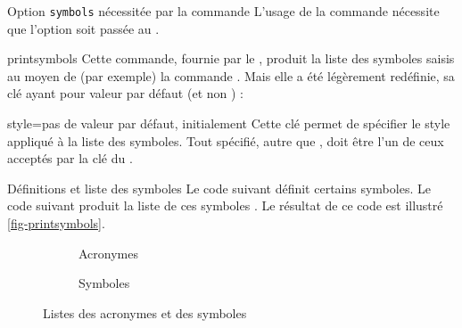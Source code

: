 \begin{dbwarning}{Option \texttt{symbols} nécessitée par la commande
    \protect{}}{}
  L'usage de la commande  nécessite que l'option
   soit passée au .
\end{dbwarning}

\begin{docCommand}{printsymbols}{}
  Cette commande, fournie par le , produit la liste des
  symboles saisis au moyen de (par exemple) la commande
  . Mais elle a été légèrement redéfinie, sa clé
   ayant pour valeur par défaut  (et non
  ) :
  \begin{docKey}{style}{=\textbar{}}{pas de valeur
      par défaut, initialement }
    Cette clé permet de spécifier le style appliqué à la liste des
    symboles. Tout  spécifié, autre que ,
    doit être l'un de ceux acceptés par la clé  du
    .
  \end{docKey}
\end{docCommand}

\begin{dbexample}{Définitions et liste des symboles}{}
  Le code suivant définit certains symboles.
  Le code suivant produit la liste de ces symboles .
  Le résultat de ce code est illustré \vref{fig-printsymbols}.
\end{dbexample}

\begin{landscape}
  \begin{figure}[p]
    \centering
    \begin{subfigure}[b]{.45\linewidth}
      \centering
      \caption{Acronymes}
      \label{fig-printacronyms}
    \end{subfigure}%
    \begin{subfigure}[b]{.45\linewidth}
      \centering
      \caption{Symboles}
      \label{fig-printsymbols}
    \end{subfigure}%
    \caption{Listes des acronymes et des symboles}
    \label{fig-printacronyms-printsymbols}
  \end{figure}
\end{landscape}

